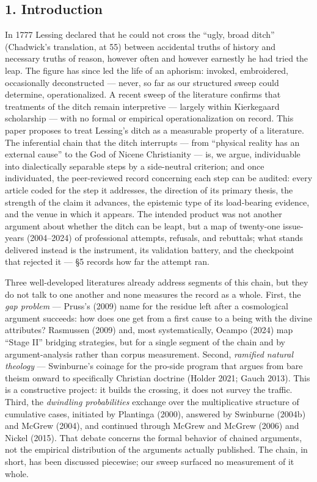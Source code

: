 \subsection{1. Introduction}\label{introduction}

In 1777 Lessing declared that he could not cross the ``ugly, broad ditch'' (Chadwick's translation, at 55) between accidental truths of history and necessary truths of reason, however often and however earnestly he had tried the leap. The figure has since led the life of an aphorism: invoked, embroidered, occasionally deconstructed --- never, so far as our structured sweep could determine, operationalized. A recent sweep of the literature confirms that treatments of the ditch remain interpretive --- largely within Kierkegaard scholarship --- with no formal or empirical operationalization on record. This paper proposes to treat Lessing's ditch as a measurable property of a literature. The inferential chain that the ditch interrupts --- from ``physical reality has an external cause'' to the God of Nicene Christianity --- is, we argue, individuable into dialectically separable steps by a side-neutral criterion; and once individuated, the peer-reviewed record concerning each step can be audited: every article coded for the step it addresses, the direction of its primary thesis, the strength of the claim it advances, the epistemic type of its load-bearing evidence, and the venue in which it appears. The intended product was not another argument about whether the ditch can be leapt, but a map of twenty-one issue-years (2004--2024) of professional attempts, refusals, and rebuttals; what stands delivered instead is the instrument, its validation battery, and the checkpoint that rejected it --- \S{}5 records how far the attempt ran.

Three well-developed literatures already address segments of this chain, but they do not talk to one another and none measures the record as a whole. First, the \emph{gap problem} --- Pruss's (2009) name for the residue left after a cosmological argument succeeds: how does one get from a first cause to a being with the divine attributes? Rasmussen (2009) and, most systematically, Ocampo (2024) map ``Stage II'' bridging strategies, but for a single segment of the chain and by argument-analysis rather than corpus measurement. Second, \emph{ramified natural theology} --- Swinburne's coinage for the pro-side program that argues from bare theism onward to specifically Christian doctrine (Holder 2021; Gauch 2013). This is a constructive project: it builds the crossing, it does not survey the traffic. Third, the \emph{dwindling probabilities} exchange over the multiplicative structure of cumulative cases, initiated by Plantinga (2000), answered by Swinburne (2004b) and McGrew (2004), and continued through McGrew and McGrew (2006) and Nickel (2015). That debate concerns the formal behavior of chained arguments, not the empirical distribution of the arguments actually published. The chain, in short, has been discussed piecewise; our sweep surfaced no measurement of it whole.

